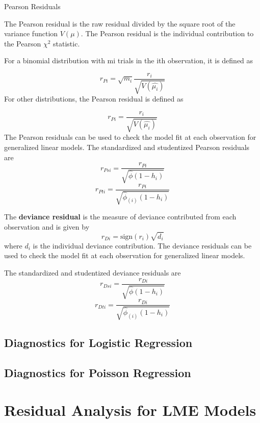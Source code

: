 \documentclass[12pt, a4paper]{article}
\theoremstyle{plain}
\theoremstyle{definition}
\theoremstyle{remark}
\begin{document}
Pearson Residuals





The Pearson residual is the raw residual divided by the square root of the variance function $V(\mu).$
The Pearson residual is the individual contribution to the Pearson $\chi^2$ statistic. 

For a binomial distribution with mi trials in the ith observation, it is defined as

\[ r_{Pi} = \sqrt{ m_{i}}
 \frac{r_{i}}{\sqrt{V(\hat{ \mu_{i}})}} \]
For other distributions, the Pearson residual is defined as

\[ r_{Pi} = \frac{r_{i}}{\sqrt{V(\hat{ \mu_{i}})}}\]
The Pearson residuals can be used to check the model fit at each observation for generalized linear models. 
The standardized and studentized Pearson residuals are
\[
r_{Psi} = \frac{r_{Pi}}{\sqrt{\hat{ \phi} (1- h_{i})} } \]
\[ r_{Pti} = \frac{r_{Pi}}{\sqrt{ \hat{ \phi}_{(i)}
 (1- h_{i})} } \]



The \textbf{deviance residual} is the measure of deviance contributed from each observation and is given by
\[r_{Di} = \textrm{sign}( r_{i})
 \sqrt{ d_{i}}\]
where $d_i$ is the individual deviance contribution.
The deviance residuals can be used to check the model fit at each observation for generalized linear models. 


The standardized and studentized deviance residuals are
\[
r_{Dsi} = \frac{r_{Di}}{\sqrt{\hat{ \phi} (1- h_{i})} }\]
\[r_{Dti} = \frac{r_{Di}}{\sqrt{ \hat{ \phi}_{(i)}
 (1- h_{i})}}\]
 
\newpage
 
\subsection{Diagnostics for Logistic Regression}

\subsection{Diagnostics for Poisson Regression}
\newpage
\section{Residual Analysis for LME Models}
\end{document}
